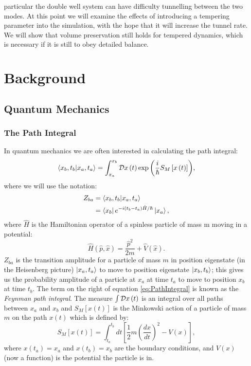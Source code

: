 \documentclass[12pt]{article}
\begin{document}
particular the double well system can have difficulty tunnelling between the two modes. At this point we will examine the effects of introducing a tempering parameter into the simulation, with the hope that it will increase the tunnel rate. We will show that volume preservation still holds for tempered dynamics, which is necessary if it is still to obey detailed balance.


\section{Background}
    \subsection{Quantum Mechanics}
        \subsubsection{The Path Integral}
        \label{sec:QuantumMechanics}
        In quantum mechanics we are often interested in calculating the path integral:
        \begin{equation}
            \label{eq:PathIntegral}
            \braket{x_b,t_b|x_a,t_a} = \int_{x_a}^{x_b} {\cal D} x\left(t\right) \exp{\left(\frac{i}{\hbar} S_M\left[x\left(t\right)\right]\right)},
        \end{equation}
        where we will use the notation:
        \begin{align}
            \label{eq:PathIntegralZ_fi}
            Z_{ba} & = \braket{x_b,t_b|x_a,t_a} \\
            \label{eq:PathIntegralZ_fi2}
                   & = \bra{x_b}e^{-i\left(t_b-t_a\right)\hat{H}/\hbar}\ket{x_a},
        \end{align}
        where $\hat{H}$ is the Hamiltonian operator of a spinless particle of mass m moving in a potential:
        \begin{equation}
            \hat{H}\left(\hat{p},\hat{x}\right) = \frac{\hat{p}^2}{2m} + \hat{V}\left(\hat{x}\right).
        \end{equation} 
        $Z_{ba}$ is the transition amplitude for a particle of mass $m$ in position eigenstate (in the Heisenberg picture) $\ket{x_a,t_a}$ to move to position eigenstate $\ket{x_b,t_b}$; this gives us the probability amplitude of a particle at $x_a$ at time $t_a$ to move to position $x_b$ at time $t_b$. The term on the right of equation \ref{eq:PathIntegral} is known as the \textit{Feynman path integral}. The measure $\int {\cal D} x\left(t\right)$ is an integral over all paths between $x_a$ and $x_b$ and $S_M\left[x\left(t\right)\right]$ is the Minkowski action of a particle of mass $m$ on the path $x\left(t\right)$ which is defined by:
        \begin{equation}
            \label{eq:MinkowskiAction}
            S_M\left[x\left(t\right)\right] = \int_{t_a}^{t_b} dt \left[\frac{1}{2}m\left(\frac{dx}{dt}\right)^2 - V(x)\right],
        \end{equation}
        where $x\left(t_a\right) = x_a$ and $x\left(t_b\right) = x_b$ are the boundary conditions, and $V\left(x\right)$ (now a function) is the potential the particle is in.
\end{document}
